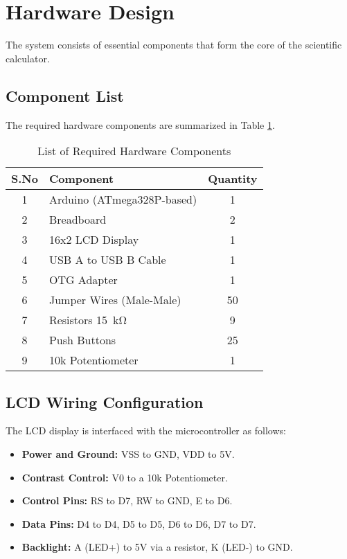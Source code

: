 \documentclass[journal]{IEEEtran}
\begin{document}
\section{Hardware Design}
The system consists of essential components that form the core of the scientific calculator.

\subsection{Component List}
The required hardware components are summarized in Table \ref{table:hardware}.

\begin{table}[h]
    \centering
    \renewcommand{\arraystretch}{1.2}
    \caption{List of Required Hardware Components}
    \label{table:hardware}
    \begin{tabular}{|c|l|c|}
        \hline
        \textbf{S.No} & \textbf{Component} & \textbf{Quantity} \\
        \hline
         1 & Arduino (ATmega328P-based) & 1 \\
         2 & Breadboard & 2 \\
         3 & 16x2 LCD Display & 1  \\
         4 & USB A to USB B Cable & 1 \\
         5 & OTG Adapter & 1 \\
         6 & Jumper Wires (Male-Male) & 50 \\
         7 & Resistors \SI{15}{\kilo\ohm} & 9 \\
         8 & Push Buttons & 25 \\
         9 & 10k Potentiometer & 1 \\
        \hline
    \end{tabular}
\end{table}

\subsection{LCD Wiring Configuration}
The LCD display is interfaced with the microcontroller as follows:
\begin{itemize}
    \item \textbf{Power and Ground:} VSS to GND, VDD to 5V.
    \item \textbf{Contrast Control:} V0 to a 10k Potentiometer.
    \item \textbf{Control Pins:} RS to D7, RW to GND, E to D6.
    \item \textbf{Data Pins:} D4 to D4, D5 to D5, D6 to D6, D7 to D7.
    \item \textbf{Backlight:} A (LED+) to 5V via a resistor, K (LED-) to GND.
\end{itemize}
\end{document}
